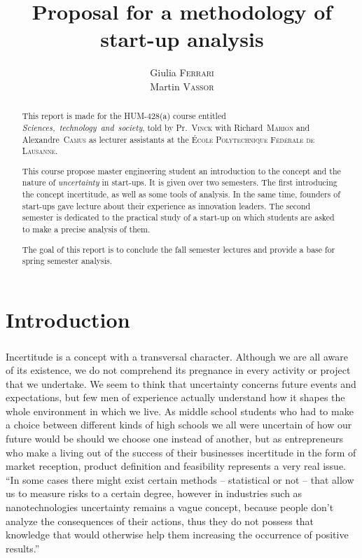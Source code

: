 \documentclass[twoside]{report}
\title{Proposal for a methodology of start-up analysis}
\author{Giulia \textsc{Ferrari}\\Martin \textsc{Vassor}}
\begin{document}
\maketitle
\begin{abstract}
	\paragraph{}
	This report is made for the HUM-428(a) course entitled \emph{Sciences,~technology~and~society}, told by Pr.~\textsc{Vinck} with Richard~\textsc{Marion} and Alexandre~\textsc{Camus} as lecturer assistants at the \textsc{École Polytechnique Fédérale de Lausanne}.

	This course propose master engineering student an introduction to the concept and the nature of \emph{uncertainty} in start-ups. It is given over two semesters. The first introducing the concept incertitude, as well as some tools of analysis. In the same time, founders of start-ups gave lecture about their experience as innovation leaders. The second semester is dedicated to the practical study of a start-up on which students are asked to make a precise analysis of them.

	The goal of this report is to conclude the fall semester lectures and provide a base for spring semester analysis.
\end{abstract}
\tableofcontents
\chapter*{Introduction}
\paragraph{}
Incertitude is a concept with a transversal character. Although we are all aware of its existence, we do not comprehend its pregnance in every activity or project that we undertake. We seem to think that uncertainty concerns future events and expectations, but few men of experience actually understand how it shapes the whole environment in which we live. As middle school students who had to make a choice between different kinds of high schools we all were uncertain of how our future would be should we choose one instead of another, but as entrepreneurs who make a living out of the success of their businesses incertitude in the form of market reception, product definition and feasibility represents a very real issue. \enquote{In some cases there might exist certain methods – statistical or not – that allow us to measure risks to a certain degree, however in industries such as nanotechnologies uncertainty remains a vague concept, because people don’t analyze the consequences of their actions, thus they do not possess that knowledge that would otherwise help them increasing the occurrence of positive results.}\cite{chalas_comment_2009}
\end{document}
